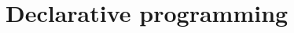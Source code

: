 \documentclass[fsharpnotes.tex]{subfiles}
\begin{document}
\part{Declarative programming}
\label{part:declarative}
\end{document}
